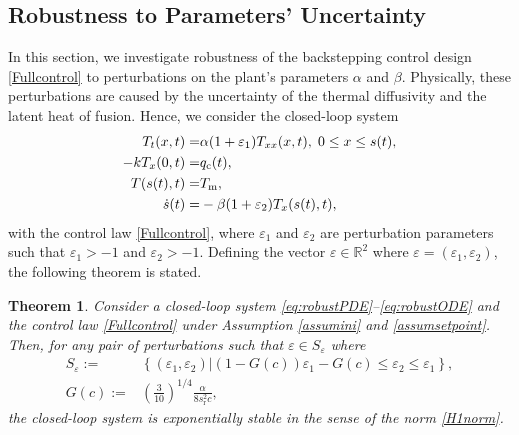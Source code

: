 \documentclass[journal]{IEEEtran}
\newtheorem{thm}{Theorem}
\begin{document}
\subsection{Robustness to Parameters' Uncertainty}\label{sec:robust}
In this section, we investigate robustness of the backstepping control design \eqref{Fullcontrol} to perturbations on the plant's parameters $\alpha$ and $\beta$. Physically, these perturbations are caused by the uncertainty of the thermal diffusivity and the latent heat of fusion. Hence, we consider the closed-loop system 
\begin{align}\label{eq:robustPDE}
T_t(x,t)=&\alpha (1+\varepsilon_1) T_{xx}(x,t), \hspace{1mm} 0\leq x\leq s(t), \\
\label{eq:robustcontrol}
-k T_x(0,t)=&q_{{\mathrm c}}(t), \\ 
\label{eq:robustBC}T(s(t),t)=&T_{{\mathrm m}},\\
\label{eq:robustODE}
 \dot{s}(t)=&-\beta(1+\varepsilon_2) T_x(s(t),t), 
\end{align}
with the control law \eqref{Fullcontrol}, where $\varepsilon_1$ and $\varepsilon_2$ are perturbation parameters such that $\varepsilon_1>-1$ and $\varepsilon_2>-1$. Defining the   vector $\varepsilon \in {\mathbb R}^2$  where $\varepsilon = (\varepsilon_1, \varepsilon_2)$, the following theorem is stated. 
\begin{thm}\label{robust-thm}
Consider a closed-loop system  \eqref{eq:robustPDE}--\eqref{eq:robustODE} and the control law \eqref{Fullcontrol} under Assumption \ref{assumini} and \ref{assumsetpoint}. Then, for any pair of perturbations such that $\varepsilon \in S_{\varepsilon}$ where 
\begin{align}\label{Se}
S_{\varepsilon} :=& \left\{ (\varepsilon_1, \varepsilon_2) | \left(1-G(c)\right) \varepsilon_1 - G(c)  \leq \varepsilon_2 \leq \varepsilon_1 \right\}, \\
G(c) :=& \left(\frac{3}{10}\right)^{1/4}\frac{ \alpha}{8 s_{{\mathrm r}}^2 c }, 
\end{align}
 the closed-loop system is exponentially stable in the sense of the norm \eqref{H1norm}.
\end{thm}
\end{document}

